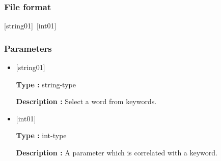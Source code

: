 \subsubsection{File format}
[string01]~[int01]
\subsubsection{Parameters}
 \begin{itemize}
   \item  $[$string01$]$
   
   {\bf Type :} string-type
   
   {\bf Description :} Select a word from keywords.
   
   \item  $[$int01$]$
   
    {\bf Type :} int-type 

   {\bf Description :} A parameter which is correlated with a keyword.\\

   
  \end{itemize}


